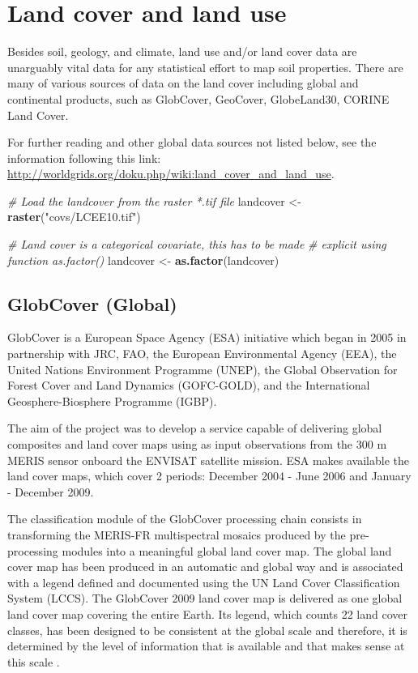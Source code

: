 \documentclass[10pt,b5paper,]{book}
\newenvironment{Shaded}{\begin{snugshade}}{\end{snugshade}}
\newcommand{\CommentTok}[1]{\textcolor[rgb]{0.56,0.35,0.01}{\textit{#1}}}
\newcommand{\KeywordTok}[1]{\textcolor[rgb]{0.13,0.29,0.53}{\textbf{#1}}}
\newcommand{\NormalTok}[1]{#1}
\newcommand{\StringTok}[1]{\textcolor[rgb]{0.31,0.60,0.02}{#1}}
\theoremstyle{definition}
\theoremstyle{definition}
\theoremstyle{definition}
\theoremstyle{remark}
\begin{document}
\hypertarget{land-cover-and-land-use}{%
\section{Land cover and land use}\label{land-cover-and-land-use}}

Besides soil, geology, and climate, land use and/or land cover data are
unarguably vital data for any statistical effort to map soil properties.
There are many of various sources of data on the land cover including
global and continental products, such as GlobCover, GeoCover,
GlobeLand30, CORINE Land Cover.

For further reading and other global data sources not listed below, see
the information following this link:
\url{http://worldgrids.org/doku.php/wiki:land_cover_and_land_use}.

\begin{Shaded}
\begin{Highlighting}[]
\CommentTok{# Load the landcover from the raster *.tif file}
\NormalTok{landcover <-}\StringTok{ }\KeywordTok{raster}\NormalTok{(}\StringTok{"covs/LCEE10.tif"}\NormalTok{)}

\CommentTok{# Land cover is a categorical covariate, this has to be made }
\CommentTok{# explicit using function as.factor()}
\NormalTok{landcover <-}\StringTok{ }\KeywordTok{as.factor}\NormalTok{(landcover)}
\end{Highlighting}
\end{Shaded}

\hypertarget{globcover-global}{%
\subsection{GlobCover (Global)}\label{globcover-global}}

GlobCover is a European Space Agency (ESA) initiative which began in
2005 in partnership with JRC, FAO, the European Environmental Agency
(EEA), the United Nations Environment Programme (UNEP), the Global
Observation for Forest Cover and Land Dynamics (GOFC-GOLD), and the
International Geosphere-Biosphere Programme (IGBP).

The aim of the project was to develop a service capable of delivering
global composites and land cover maps using as input observations from
the 300 m MERIS sensor onboard the ENVISAT satellite mission. ESA makes
available the land cover maps, which cover 2 periods: December 2004 -
June 2006 and January - December 2009.

The classification module of the GlobCover processing chain consists in
transforming the MERIS-FR multispectral mosaics produced by the
pre-processing modules into a meaningful global land cover map. The
global land cover map has been produced in an automatic and global way
and is associated with a legend defined and documented using the UN Land
Cover Classification System (LCCS). The GlobCover 2009 land cover map is
delivered as one global land cover map covering the entire Earth. Its
legend, which counts 22 land cover classes, has been designed to be
consistent at the global scale and therefore, it is determined by the
level of information that is available and that makes sense at this
scale \citep{bontemps2011globcover}.
\end{document}
